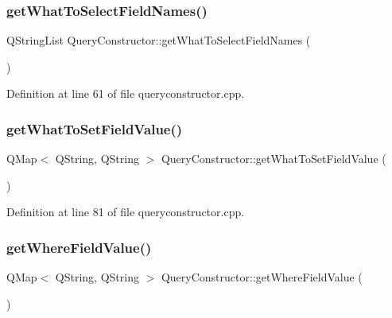 \hypertarget{classQueryConstructor_af5d3d02ae4bb5cbc734dd857e43e6248}{}\label{classQueryConstructor_af5d3d02ae4bb5cbc734dd857e43e6248} 
\subsubsection{\texorpdfstring{get\+What\+To\+Select\+Field\+Names()}{getWhatToSelectFieldNames()}}
{\footnotesize\ttfamily Q\+String\+List Query\+Constructor\+::get\+What\+To\+Select\+Field\+Names (\begin{DoxyParamCaption}{ }\end{DoxyParamCaption})}



Definition at line 61 of file queryconstructor.\+cpp.

\hypertarget{classQueryConstructor_a9bd4099539666a1c62e8f4eda9b051f1}{}\label{classQueryConstructor_a9bd4099539666a1c62e8f4eda9b051f1} 
\subsubsection{\texorpdfstring{get\+What\+To\+Set\+Field\+Value()}{getWhatToSetFieldValue()}}
{\footnotesize\ttfamily Q\+Map$<$ Q\+String, Q\+String $>$ Query\+Constructor\+::get\+What\+To\+Set\+Field\+Value (\begin{DoxyParamCaption}{ }\end{DoxyParamCaption})}



Definition at line 81 of file queryconstructor.\+cpp.

\hypertarget{classQueryConstructor_a0633e6811dc4b75555dc9519b2df4115}{}\label{classQueryConstructor_a0633e6811dc4b75555dc9519b2df4115} 
\subsubsection{\texorpdfstring{get\+Where\+Field\+Value()}{getWhereFieldValue()}}
{\footnotesize\ttfamily Q\+Map$<$ Q\+String, Q\+String $>$ Query\+Constructor\+::get\+Where\+Field\+Value (\begin{DoxyParamCaption}{ }\end{DoxyParamCaption})}



